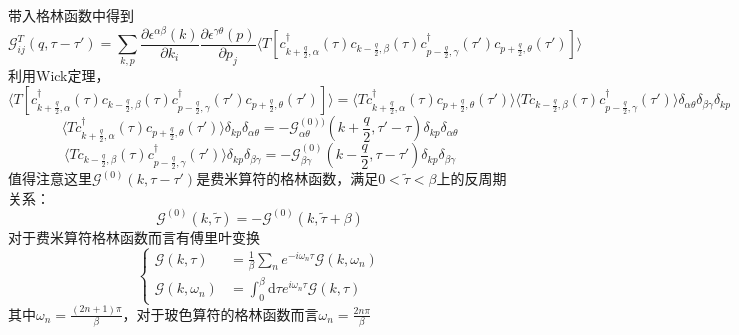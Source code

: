 \documentclass{article}
\numberwithin{equation}{subsection}
\begin{document}
带入格林函数中得到
\begin{equation}
    \mathcal{G}^T_{ij}(q,\tau-\tau')=\sum_{k,p}\frac{\partial\epsilon^{\alpha\beta}(k)}{\partial k_i}\frac{\partial\epsilon^{\gamma\theta}(p)}{\partial p_j}\langle T[c_{k+\frac{q}{2},\alpha}^\dagger(\tau)c_{k-\frac{q}{2},\beta}(\tau)c_{p-\frac{q}{2},\gamma}^\dagger(\tau')c_{p+\frac{q}{2},\theta}(\tau')]\rangle
\end{equation}
利用Wick定理，
\begin{equation}
    \langle T[c_{k+\frac{q}{2},\alpha}^\dagger(\tau)c_{k-\frac{q}{2},\beta}(\tau)c_{p-\frac{q}{2},\gamma}^\dagger(\tau')c_{p+\frac{q}{2},\theta}(\tau')]\rangle=\langle Tc_{k+\frac{q}{2},\alpha}^\dagger(\tau)c_{p+\frac{q}{2},\theta}(\tau')\rangle\langle Tc_{k-\frac{q}{2},\beta}(\tau)c_{p-\frac{q}{2},\gamma}^\dagger(\tau')\rangle\delta_{\alpha\theta}\delta_{\beta\gamma}\delta_{kp}
\end{equation}
\begin{equation}
    \langle Tc_{k+\frac{q}{2},\alpha}^\dagger(\tau)c_{p+\frac{q}{2},\theta}(\tau')\rangle\delta_{kp}\delta_{\alpha\theta}=-\mathcal{G}_{\alpha\theta}^{(0))}(k+\frac{q}{2},\tau'-\tau)\delta_{kp}\delta_{\alpha\theta}
\end{equation}
\begin{equation}
    \langle Tc_{k-\frac{q}{2},\beta}(\tau)c_{p-\frac{q}{2},\gamma}^\dagger(\tau')\rangle\delta_{kp}\delta_{\beta\gamma}=-\mathcal{G}_{\beta\gamma}^{(0)}(k-\frac{q}{2},\tau-\tau')\delta_{kp}\delta_{\beta\gamma}
\end{equation}
值得注意这里$\mathcal{G}^{(0)}(k,\tau-\tau')$是费米算符的格林函数，满足$0<\tilde{\tau}<\beta$上的反周期关系：
\begin{equation}
    \mathcal{G}^{(0)}(k,\tilde{\tau})=-\mathcal{G}^{(0)}(k,\tilde{\tau}+\beta)
\end{equation}
对于费米算符格林函数而言有傅里叶变换
\begin{equation}
    \begin{cases}
        \mathcal{G}(k,\tau)&=\frac{1}{\beta}\sum_{n}e^{-i\omega_n\tau}\mathcal{G}(k,\omega_n)\\
        \mathcal{G}(k,\omega_n)&=\int_{0}^{\beta}\mathrm{d}\tau e^{i\omega_n\tau}\mathcal{G}(k,\tau)
    \end{cases}
\end{equation}
其中$\omega_n=\frac{(2n+1)\pi}{\beta}$，对于玻色算符的格林函数而言$\omega_n=\frac{2n\pi}{\beta}$
\end{document}
